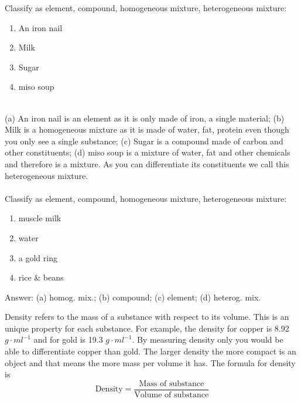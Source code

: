 \documentclass[main.tex]{subfiles}
\begin{document}
\begin{description}
\begin{example} %
Classify as  element, compound, homogeneous mixture, heterogeneous mixture:
\begin{multicols}{4}
\begin{enumerate}[label=(\alph*)]
\item An iron nail
\item Milk
\item Sugar
\item miso soup 
\end{enumerate}
\end{multicols}
\\
(a) An iron nail is an element as it is only made of iron, a single material; (b) Milk is a homogeneous mixture as it is made of water, fat, protein even though you only see a single substance; (c) Sugar is a compound made of carbon and other constituents; (d) miso soup is a mixture of water, fat and other chemicals and therefore is a mixture. As you can differentiate its constituents we call this heterogeneous mixture.\\
\faDiamond\ \\
Classify as  element, compound, homogeneous mixture, heterogeneous mixture:
\begin{multicols}{4}
\begin{enumerate}[label=(\alph*)]
\item muscle milk
\item water
\item a gold ring
\item rice \& beans
\end{enumerate}
\end{multicols}
\flushright Answer: (a) homog. mix.; (b) compound; (c) element; (d) heterog. mix.
\end{example}%



\item[\docfilehook{Density }{Density }] Density refers to the mass of a substance with respect to its volume. This is an unique property for each substance. For example, the density for copper is 8.92 $g\cdot ml^{-1}$ and for gold is 19.3 $g\cdot ml^{-1}$. By measuring density only you would be able to differentiate copper than gold. The larger density the more compact is an object and that means the more mass per volume it has. The formula for density is
\begin{equation}
\boxed{   \text{Density}=\frac{\text{Mass of substance}}{\text{Volume of substance}}   }
\label{formula1:1}
\end{equation}


\end{description}
\end{document}
